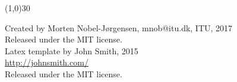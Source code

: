 \documentclass[11pt,a4paper,landscape]{scrartcl} %
\begin{document}
\begin{multicols}{2}

\vspace{\baselineskip}
\linethickness{0.5mm} %
{\color{mygray}\line(1,0){30}} %

\footnotesize{
Created by Morten Nobel-Jørgensen, mnob@itu.dk, ITU, 2017\\ 

Released under the MIT license. \\

Latex template by John Smith, 2015\\ 
\url{http://johnsmith.com/}\\
				
Released under the MIT license.
}

\end{multicols}

\end{document}
